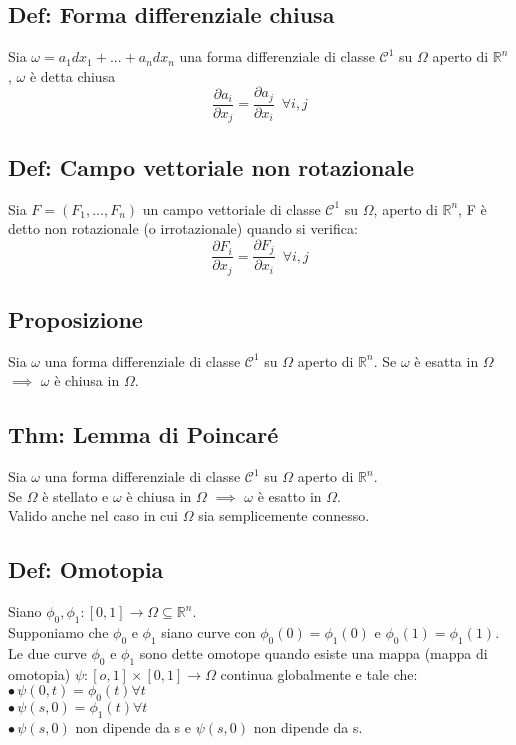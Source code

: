 \documentclass{article} %
\begin{document}
    \subsection*{Def: Forma differenziale chiusa}
    Sia $\omega = a_1 dx_1 + ... + a_n dx_n$ una forma differenziale di classe $\mathcal{C} ^1$ su $\Omega$ aperto di $\mathbb{R}^n$, $\omega$ è detta chiusa \\
    $$ \frac{\partial a_i}{ \partial x_j} = \frac{\partial a_j}{\partial x_i} \,\,\, \forall i,j $$

    \subsection*{Def: Campo vettoriale non rotazionale}
    Sia $F = (F_1,...,F_n)$ un campo vettoriale di classe $\mathcal{C} ^1$ su $\Omega$, aperto di $\mathbb{R}^n$, F è detto non rotazionale (o irrotazionale) quando si verifica:
    $$\frac{\partial F_i}{ \partial x_j} = \frac{\partial F_j}{\partial x_i} \,\,\, \forall i,j$$

    \subsection*{Proposizione}
    Sia $\omega$ una forma differenziale di classe $\mathcal{C}^1$ su $\Omega$ aperto di $\mathbb{R}^n$.
    Se $\omega$ è esatta in $\Omega$ $\implies$ $\omega$ è chiusa in $\Omega$.

    \subsection*{Thm: Lemma di Poincaré}
    Sia $\omega$ una forma differenziale di classe $\mathcal{C}^1$ su $\Omega$ aperto di $\mathbb{R}^n$. \\
    Se $\Omega$ è stellato e $\omega$ è chiusa in $\Omega$ $\implies$ $\omega$ è esatto in $\Omega$.\\
    Valido anche nel caso in cui $\Omega$ sia semplicemente connesso.

    \subsection*{Def: Omotopia}
    Siano $\phi_0, \phi_1:[0,1] \to \Omega \subseteq \mathbb{R}^n$. \\ Supponiamo che $\phi_0$ e $\phi_1$ siano curve con $\phi_0(0)=\phi_1(0)$ e $\phi_0(1)=\phi_1(1)$. \\ Le due curve $\phi_0$ e $\phi_1$ sono dette omotope quando esiste una mappa (mappa di omotopia) $\psi:[o,1] \times [0,1] \to \Omega$ continua globalmente e tale che: \\
    $\bullet \, \psi(0,t)=\phi_0(t) \forall t$ \\
    $\bullet \, \psi(s,0)=\phi_1(t) \forall t$ \\
    $\bullet \, \psi(s,0)$ non dipende da s e $\psi(s,0)$ non dipende da s.
\end{document}
